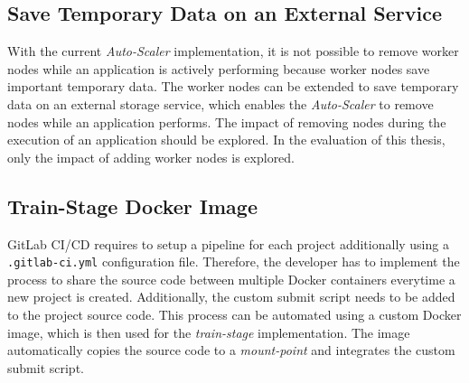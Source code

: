 \subsection{Save Temporary Data on an External Service}
With the current \textit{Auto-Scaler} implementation, it is not possible to remove worker nodes while an application is actively performing because worker nodes save important temporary data.
The worker nodes can be extended to save temporary data on an external storage service, which enables the \textit{Auto-Scaler} to remove nodes while an application performs.
% 
The impact of removing nodes during the execution of an application should be explored. In the evaluation of this thesis, only the impact of adding worker nodes is explored.


\subsection{Train-Stage Docker Image}
GitLab CI/CD requires to setup a pipeline for each project additionally using a \texttt{.gitlab-ci.yml} configuration file.
Therefore, the developer has to implement the process to share the source code between multiple Docker containers everytime a new project is created. Additionally, the custom submit script needs to be added to the project source code.
This process can be automated using a custom Docker image, which is then used for the \textit{train-stage} implementation. The image automatically copies the source code to a \textit{mount-point} and integrates the custom submit script.